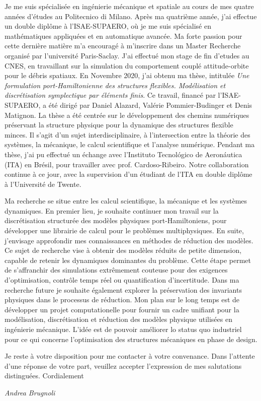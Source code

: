 \documentclass[11pt]{letter}
\begin{document}
	Je me suis spécialisée en ingénierie mécanique et spatiale au cours de mes quatre années d'études au Politecnico di Milano. Après ma quatrième année, j'ai effectue un double diplôme \`a l'ISAE-SUPAERO, o\`u je me suis spécialisé en mathématiques appliquées et en automatique avancée. Ma forte passion pour cette dernière matière m'a encouragé à m'inscrire dans un Master Recherche organisé par l'université Paris-Saclay. J'ai effectué mon stage de fin d'etudes au CNES, en travaillant sur la simulation du comportement couplé attitude-orbite pour le débris spatiaux. En Novembre 2020, j'ai obtenu ma thèse, intitulée \textit{Une formulation port-Hamiltonienne des structures flexibles. Modélisation et discrétisation symplectique par éléments finis}. Ce travail, financé par l'ISAE-SUPAERO, a été dirigé par Daniel Alazard, Valérie Pommier-Budinger et Denis Matignon. La thèse a été centrée sur le développement des chemins numériques préservant la structure physique pour la dynamique des structures flexible minces. Il s'agit d'un sujet interdisciplinaire, \`a l'intersection entre la théorie des systèmes, la mécanique, le calcul scientifique et l'analyse numérique. Pendant ma thèse, j'ai pu effectué un échange avec l'Instituto Tecnológico de Aeronáutica (ITA) en Brésil, pour travailler avec prof. Cardoso-Ribeiro. Notre collaboration continue \`a ce jour, avec la supervision d'un étudiant de l'ITA en double diplôme \`a l'Universit\'e de Twente. 
	
	Ma recherche se situe entre les calcul scientifique, la mécanique et les systèmes dynamiques. En premier lieu, je souhaite continuer mon travail sur la discrétisation structurée des modèles physiques port-Hamiltoniens, pour développer une librairie de calcul pour le problèmes multiphysiques. En suite, j'envisage approfondir mes connaissances en méthodes de réduction des modèles. Ce sujet de recherche vise \`a obtenir des modèles réduits de petite dimension, capable de retenir les dynamiques dominantes du problème. Cette étape permet de s'affranchir des simulations extrêmement couteuse pour des exigences d'optimisation, contrôle temps réel ou quantification d'incertitude. Dans ma recherche future je souhaite également explorer la préservation des invariants physiques dans le processus de réduction. Mon plan sur le long temps est de développer un projet computationelle pour fournir un cadre unifiant pour la modélisation, discrétisation et réduction des modèles physique utilisées en ingénierie mécanique. L'idée est de pouvoir améliorer lo status quo industriel pour ce qui concerne l'optimisation des structures mécaniques en phase de design. 
	

	Je reste à votre disposition pour me contacter à votre convenance. Dans l'attente d'une réponse de votre part, veuillez accepter l'expression de mes salutations distinguées. Cordialement
	
	
	\begin{center}
		\large\textit{Andrea Brugnoli}
	\end{center}
\end{document}
